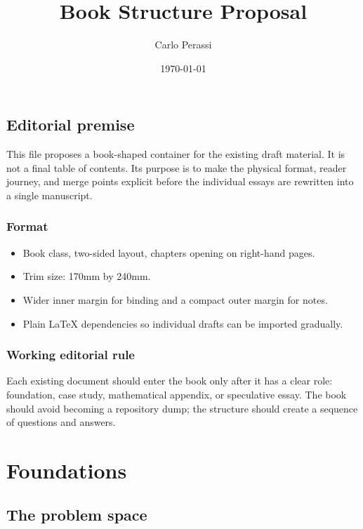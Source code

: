 \documentclass[11pt,twoside,openright]{book}
\title{Book Structure Proposal}
\author{Carlo Perassi}
\date{\today}
\begin{document}
\frontmatter
\maketitle
\tableofcontents

\chapter{Editorial premise}

This file proposes a book-shaped container for the existing draft material. It is
not a final table of contents. Its purpose is to make the physical format,
reader journey, and merge points explicit before the individual essays are
rewritten into a single manuscript.

\section*{Format}

\begin{itemize}
  \item Book class, two-sided layout, chapters opening on right-hand pages.
  \item Trim size: 170mm by 240mm.
  \item Wider inner margin for binding and a compact outer margin for notes.
  \item Plain LaTeX dependencies so individual drafts can be imported gradually.
\end{itemize}

\section*{Working editorial rule}

Each existing document should enter the book only after it has a clear role:
foundation, case study, mathematical appendix, or speculative essay. The book
should avoid becoming a repository dump; the structure should create a sequence
of questions and answers.

\mainmatter

\part{Foundations}

\chapter{The problem space}
\end{document}
